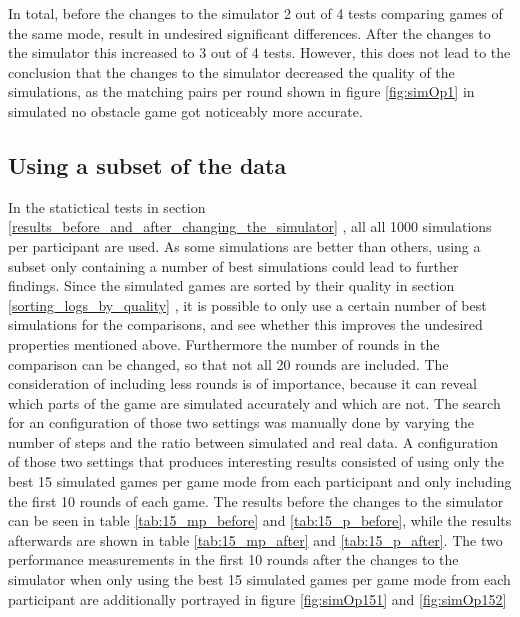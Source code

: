 In total, before the changes to the simulator 2 out of 4 tests comparing games of the same mode, result in undesired significant differences. After the changes to the simulator this increased to 3 out of 4 tests. However, this does not lead to the conclusion that the changes to the simulator decreased the quality of the simulations, as the matching pairs per round shown in figure \ref{fig:simOp1} in simulated no obstacle game got noticeably more accurate. 

\subsection{Using a subset of the data}
\label{search_for_a_subset}
In the statictical tests in section \ref{results_before_and_after_changing_the_simulator} , all all 1000 simulations per participant are used. As some simulations are better than others, using a subset only containing a number of best simulations could lead to further findings. Since the simulated games are sorted by their quality in section \ref{sorting_logs_by_quality} , it is possible to only use a certain number of best simulations for the comparisons, and see whether this improves the undesired properties mentioned above. Furthermore the number of rounds in the comparison can be changed, so that not all 20 rounds are included. The consideration of including less rounds is of importance, because it can reveal which parts of the game are simulated accurately and which are not. The search for an configuration of those two settings was manually done by varying the number of steps and the ratio between simulated and real data. A configuration of those two settings that produces interesting results consisted of using only the best 15 simulated games per game mode from each participant and only including the first 10 rounds of each game. The results before the changes to the simulator can be seen in table \ref{tab:15_mp_before} and \ref{tab:15_p_before}, while the results afterwards are shown in table \ref{tab:15_mp_after} and \ref{tab:15_p_after}. The two performance measurements in the first 10 rounds after the changes to the simulator when only using the best 15 simulated games per game mode from each participant are additionally portrayed in figure \ref{fig:simOp151} and \ref{fig:simOp152}
\newpage

